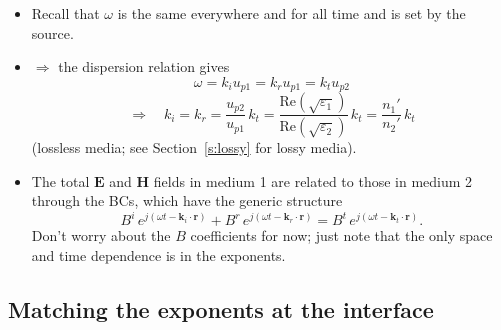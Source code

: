 \documentclass[11pt, oneside]{article}
\begin{document}
\begin{itemize}
	\item Recall that $\omega$ is the same everywhere and for all time and is set by the source.
	\item[] $\Rightarrow$ the dispersion relation gives
	\begin{equation}
		\omega = k_iu_{p1} = k_ru_{p1} = k_tu_{p2}
	\end{equation}
	\begin{equation}
		\label{e:k_ratio}
		\Rightarrow\quad
		\boxed{k_i = k_r = \frac{u_{p2}}{u_{p1}}\,k_t = \frac{\mathrm{Re}\left(\sqrt{\varepsilon_1}\right)}{\mathrm{Re}\left(\sqrt{\varepsilon_2}\right)}\,k_t = \frac{n_1'}{n_2'}\,k_t}
	\end{equation}
	(lossless media; see Section~\ref{s:lossy} for lossy media).
	\item The total $\mathbf{E}$ and $\mathbf{H}$ fields in medium 1 are related to those in medium 2 through the BCs, which have the generic structure
	\begin{equation}
		\label{e:generic}
		B^i\,e^{j(\omega t - \mathbf{k}_i\cdot\mathbf{r})} + B^r\,e^{j(\omega t - \mathbf{k}_r\cdot\mathbf{r})} = B^t\,e^{j(\omega t - \mathbf{k}_t\cdot\mathbf{r})}.
	\end{equation}
	Don't worry about the $B$ coefficients for now; just note that the only space and time dependence is in the exponents.
\end{itemize}

\subsection{Matching the exponents at the interface}
\end{document}
